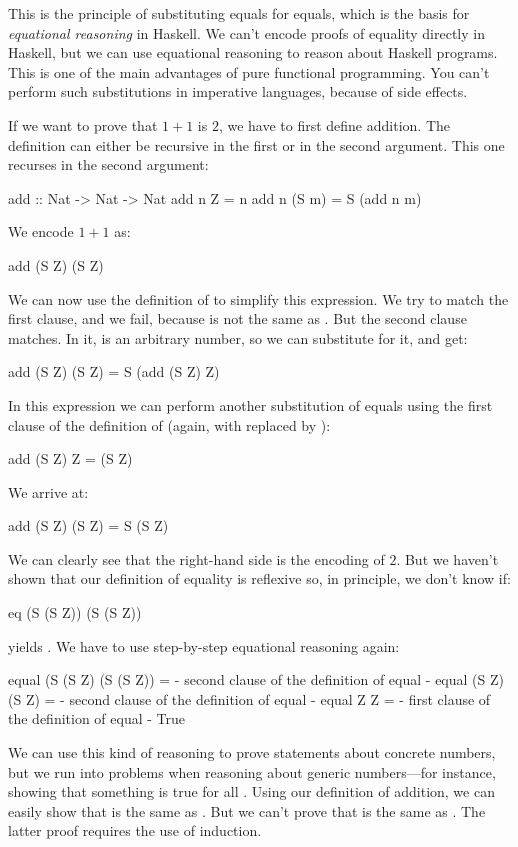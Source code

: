 \documentclass[DaoFP]{subfiles}
\begin{document}
This is the principle of substituting equals for equals, which is the basis for \emph{equational reasoning} in Haskell. We can't encode proofs of equality directly in Haskell, but we can use equational reasoning to reason about Haskell programs. This is one of the main advantages of pure functional programming. You can't perform such substitutions in imperative languages, because of side effects.

If we want to prove that $1+1$ is $2$, we have to first define addition. The definition can either be recursive in the first or in the second argument. This one recurses in the second argument:
\begin{haskell}
add :: Nat -> Nat -> Nat
add n Z = n
add n (S m) = S (add n m)
\end{haskell}
We encode $1 + 1$ as:
\begin{haskell}
add (S Z) (S Z)
\end{haskell}
We can now use the definition of  to simplify this expression. We try to match the first clause, and we fail, because  is not the same as . But the second clause matches. In it,  is an arbitrary number, so we can substitute  for it, and get:
\begin{haskell}
add (S Z) (S Z) = S (add (S Z) Z)
\end{haskell}
In this expression we can perform another substitution of equals using the first clause of the definition of  (again, with  replaced by ):
\begin{haskell}
add (S Z) Z = (S Z)
\end{haskell}
We arrive at:
\begin{haskell}
add (S Z) (S Z) = S (S Z)
\end{haskell}
We can clearly see that the right-hand side is the encoding of $2$. But we haven't shown that our definition of equality is reflexive so, in principle, we don't know if:
\begin{haskell}
eq (S (S Z)) (S (S Z))
\end{haskell}
yields . We have to use step-by-step equational reasoning again:
\begin{haskell}
equal (S (S Z) (S (S Z)) =
{- second clause of the definition of equal -}
equal (S Z) (S Z) =
{- second clause of the definition of equal -}
equal Z Z =
{- first clause of the definition of equal -}
True
\end{haskell}

We can use this kind of reasoning to prove statements about concrete numbers, but we run into problems when reasoning about generic numbers---for instance, showing that something is true for all . Using our definition of addition, we can easily show that  is the same as . But we can't prove that  is the same as . The latter proof requires the use of induction. 
\end{document}
